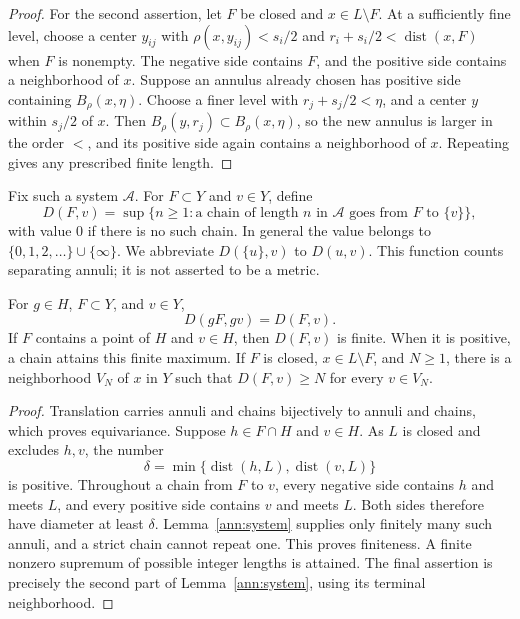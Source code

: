 \begin{proof}
For the second assertion, let $F$ be closed and $x\in L\setminus F$.
At a sufficiently fine level, choose a center $y_{ij}$ with
$\rho(x,y_{ij})<s_i/2$ and
$r_i+s_i/2<\operatorname{dist}(x,F)$ when $F$ is nonempty.
The negative side contains $F$, and the positive side contains a
neighborhood of $x$. Suppose an annulus already chosen has positive
side containing $B_\rho(x,\eta)$. Choose a finer level with
$r_j+s_j/2<\eta$, and a center $y$ within $s_j/2$ of $x$.
Then $B_\rho(y,r_j)\subset B_\rho(x,\eta)$, so the new annulus is
larger in the order $<$, and its positive side again contains a
neighborhood of $x$. Repeating gives any prescribed finite length.
\end{proof}

Fix such a system $\mathcal A$. For $F\subset Y$ and $v\in Y$, define
\[
  D(F,v)=\sup\{n\geq1:
       \text{a chain of length }n\text{ in }\mathcal A
       \text{ goes from }F\text{ to }\{v\}\},
\]
with value $0$ if there is no such chain. In general the value belongs
to $\{0,1,2,\ldots\}\cup\{\infty\}$. We abbreviate $D(\{u\},v)$
to $D(u,v)$. This function counts separating annuli; it is not asserted
to be a metric.

\begin{lemma}\label{ann:depth}
For $g\in H$, $F\subset Y$, and $v\in Y$,
\[
  D(gF,gv)=D(F,v).
\]
If $F$ contains a point of $H$ and $v\in H$, then $D(F,v)$ is finite.
When it is positive, a chain attains this finite maximum.
If $F$ is closed, $x\in L\setminus F$, and $N\geq1$, there is a
neighborhood $V_N$ of $x$ in $Y$ such that $D(F,v)\geq N$ for every
$v\in V_N$.
\end{lemma}

\begin{proof}
Translation carries annuli and chains bijectively to annuli and chains,
which proves equivariance. Suppose $h\in F\cap H$ and $v\in H$.
As $L$ is closed and excludes $h,v$, the number
\[
  \delta=\min\{\operatorname{dist}(h,L),
                    \operatorname{dist}(v,L)\}
\]
is positive. Throughout a chain from $F$ to $v$, every negative side
contains $h$ and meets $L$, and every positive side contains $v$ and
meets $L$. Both sides therefore have diameter at least $\delta$.
Lemma~\ref{ann:system} supplies only finitely many such annuli, and a
strict chain cannot repeat one. This proves finiteness. A finite
nonzero supremum of possible integer lengths is attained.
The final assertion is precisely the second part of
Lemma~\ref{ann:system}, using its terminal neighborhood.
\end{proof}
